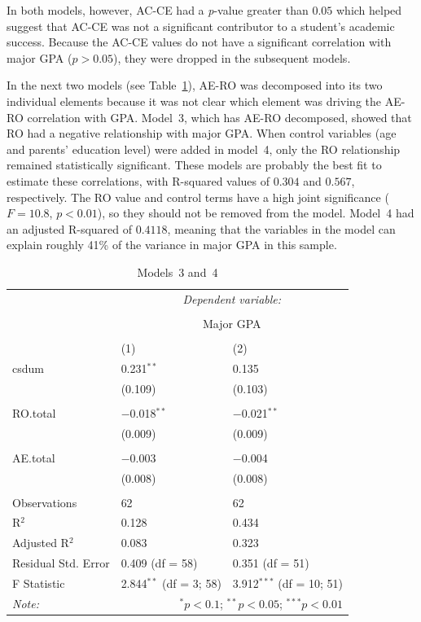 In both models, however, AC-CE had a \textit{p}-value greater than $0.05$ which helped suggest that AC-CE was not a significant contributor to a student's academic success. Because the AC-CE values do not have a significant correlation with major GPA ($p>0.05$), they were dropped in the subsequent models.

In the next two models (see Table~\ref{tab:models34}), AE-RO was decomposed into its two individual elements because it was not clear which element was driving the AE-RO correlation with GPA. Model~3, which has AE-RO decomposed, showed that RO had a negative relationship with major GPA. When control variables (age and parents' education level) were added in model~4, only the RO relationship remained statistically significant. These models are probably the best fit to estimate these correlations, with R-squared values of $0.304$ and $0.567$, respectively. The RO value and control terms have a high joint significance ($F=10.8$, $p<0.01$), so they should not be removed from the model. Model~4 had an adjusted R-squared of $0.4118$, meaning that the variables in the model can explain roughly 41\% of the variance in major GPA in this sample.

\begin{table}[!htbp] \centering
  \caption[Models~3 and~4]{Models~3 and~4}
  \label{tab:models34}
  \begin{tabular}{@{\extracolsep{5pt}}lll}
    \toprule
     & \multicolumn{2}{c}{\textit{Dependent variable:}} \\
    \cline{2-3}
    \\[-1.8ex] & \multicolumn{2}{c}{Major GPA} \\
    \\[-1.8ex] & (1) & (2)\\
    \midrule
    csdum & 0.231$^{**}$ & 0.135 \\
      & (0.109) & (0.103) \\
      & & \\
    RO.total & $-$0.018$^{**}$ & $-$0.021$^{**}$ \\
      & (0.009) & (0.009) \\
      & & \\
    AE.total & $-$0.003 & $-$0.004 \\
      & (0.008) & (0.008) \\
      & & \\
    \midrule
    Observations & 62 & 62 \\
    R$^{2}$ & 0.128 & 0.434 \\
    Adjusted R$^{2}$ & 0.083 & 0.323 \\
    Residual Std. Error & 0.409 (df = 58) & 0.351 (df = 51) \\
    F Statistic & 2.844$^{**}$ (df = 3; 58) & 3.912$^{***}$ (df = 10; 51) \\
    \bottomrule
    \textit{Note:}  & \multicolumn{2}{r}{$^{*}p<0.1$; $^{**}p<0.05$; $^{***}p<0.01$} \\
  \end{tabular}
\end{table}

